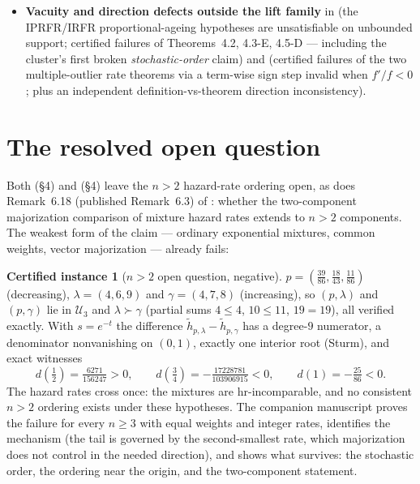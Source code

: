 \documentclass[10pt]{article}
\theoremstyle{plain}
\theoremstyle{definition}
\newtheorem{certificate}[theorem]{Certified instance}
\theoremstyle{remark}
\begin{document}
\begin{itemize}
\item \textbf{Vacuity and direction defects outside the lift family} in \cite{BhaktaTorradoDasKayal2024} (the IPRFR/IRFR proportional-ageing hypotheses are unsatisfiable on unbounded support; certified failures of Theorems~4.2, 4.3-E, 4.5-D --- including the cluster's first broken \emph{stochastic-order} claim) and \cite{BhaktaGuptaSaadatKiaKayal2025} (certified failures of the two multiple-outlier rate theorems via a term-wise sign step invalid when $f'/f<0$; plus an independent definition-vs-theorem direction inconsistency).
\end{itemize}

\section{The resolved open question}\label{sec:open}

Both \cite{HazraFinkelstein2018} (\S4) and \cite{NadebTorabi2022} (\S4) leave the $n>2$ hazard-rate ordering open, as does Remark~6.18 (published Remark~6.3) of \cite{ShojaeeAsadiFinkelstein2022}: whether the two-component majorization comparison of mixture hazard rates extends to $n>2$ components. The weakest form of the claim --- ordinary exponential mixtures, common weights, vector majorization --- already fails:

\begin{certificate}[$n>2$ open question, negative]\label{cer:open}
$p=(\tfrac{39}{86},\tfrac{18}{43},\tfrac{11}{86})$ (decreasing), $\lambda=(4,6,9)$ and $\gamma=(4,7,8)$ (increasing), so $(p,\lambda)$ and $(p,\gamma)$ lie in $\mathcal U_3$ and $\lambda\succ\gamma$ (partial sums $4\le4$, $10\le11$, $19=19$), all verified exactly. With $s=e^{-t}$ the difference $\tilde h_{p,\lambda}-\tilde h_{p,\gamma}$ has a degree-$9$ numerator, a denominator nonvanishing on $(0,1)$, exactly one interior root (Sturm), and exact witnesses
\[
d(\tfrac12)=\tfrac{6271}{156247}>0,\qquad d(\tfrac34)=-\tfrac{17228781}{103906915}<0,\qquad d(1)=-\tfrac{25}{86}<0 .
\]
The hazard rates cross once: the mixtures are hr-incomparable, and no consistent $n>2$ ordering exists under these hypotheses. The companion manuscript \cite{Guo2026hazard} proves the failure for every $n\ge3$ with equal weights and integer rates, identifies the mechanism (the tail is governed by the second-smallest rate, which majorization does not control in the needed direction), and shows what survives: the stochastic order, the ordering near the origin, and the two-component statement.
\end{certificate}
\end{document}
